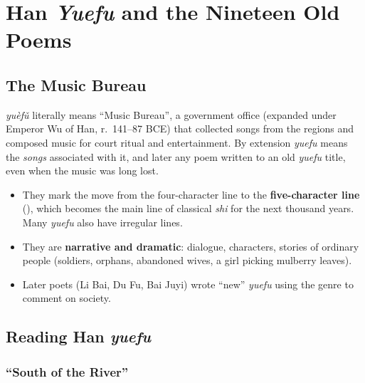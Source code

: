 \chapter{Han \emph{Yuefu} and the Nineteen Old Poems}

\section{The Music Bureau}

\begin{definition}
 \emph{yuèfǔ} literally means ``Music Bureau'', a government office (expanded
under Emperor Wu of Han, r.\ 141--87 BCE) that collected songs from the regions and
composed music for court ritual and entertainment. By extension \emph{yuefu} means the
\emph{songs} associated with it, and later any poem written to an old \emph{yuefu} title,
even when the music was long lost.
\end{definition}

\begin{important}
\begin{itemize}
  \item They mark the move from the four-character line to the \textbf{five-character
        line} (), which becomes the main line of classical \emph{shi} for the
        next thousand years. Many \emph{yuefu} also have irregular lines.
  \item They are \textbf{narrative and dramatic}: dialogue, characters, stories of ordinary
        people (soldiers, orphans, abandoned wives, a girl picking mulberry leaves).
  \item Later poets (Li Bai, Du Fu, Bai Juyi) wrote ``new'' \emph{yuefu} using the genre
        to comment on society.
\end{itemize}
\end{important}

\section{Reading Han \emph{yuefu}}

\subsection{``South of the River'' }

